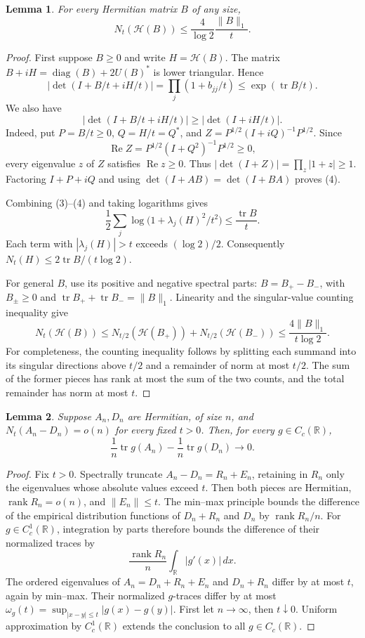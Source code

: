 \documentclass[11pt]{article}
\newtheorem{lemma}{Lemma}
\newcommand{\tr}{\operatorname{tr}}
\newcommand{\Rea}{\operatorname{Re}}
\newcommand{\HH}{\mathcal H}
\begin{document}
\begin{lemma}\label{weak}
For every Hermitian matrix \(B\) of any size,
\[
 N_t(\HH(B))\le \frac{4}{\log 2}\frac{\|B\|_1}{t}.
 \tag{2}
\]
\end{lemma}
\begin{proof}
First suppose \(B\ge0\) and write \(H=\HH(B)\).
The matrix \(B+iH=\operatorname{diag}(B)+2U(B)^*\) is lower triangular.
Hence
\[
 \left|\det(I+B/t+iH/t)\right|
 =\prod_j(1+b_{jj}/t)
 \le \exp(\tr B/t).
 \tag{3}
\]
We also have
\[
 |\det(I+B/t+iH/t)|\ge |\det(I+iH/t)|.
 \tag{4}
\]
Indeed, put \(P=B/t\ge0\), \(Q=H/t=Q^*\), and
\(Z=P^{1/2}(I+iQ)^{-1}P^{1/2}\).
Since
\[
 \Rea Z=P^{1/2}(I+Q^2)^{-1}P^{1/2}\ge0,
\]
every eigenvalue \(z\) of \(Z\) satisfies \(\Rea z\ge0\).
Thus \(|\det(I+Z)|=\prod_z|1+z|\ge1\).
Factoring \(I+P+iQ\) and using
\(\det(I+AB)=\det(I+BA)\) proves (4).

Combining (3)--(4) and taking logarithms gives
\[
 \frac12\sum_j\log\bigl(1+\lambda_j(H)^2/t^2\bigr)
 \le \frac{\tr B}{t}.
\]
Each term with \(|\lambda_j(H)|>t\) exceeds \((\log 2)/2\).
Consequently \(N_t(H)\le 2\tr B/(t\log 2)\).

For general \(B\), use its positive and negative spectral parts:
\(B=B_+-B_-\), with \(B_\pm\ge0\) and
\(\tr B_++\tr B_-=\|B\|_1\). Linearity and the singular-value
counting inequality give
\[
 N_t(\HH(B))
 \le N_{t/2}(\HH(B_+))+N_{t/2}(\HH(B_-))
 \le \frac{4\|B\|_1}{t\log2}.
\]
For completeness, the counting inequality follows by splitting each
summand into its singular directions above \(t/2\) and a remainder
of norm at most \(t/2\). The sum of the former pieces has rank at most
the sum of the two counts, and the total remainder has norm at most \(t\).
\end{proof}

\begin{lemma}\label{stability}
Suppose \(A_n,D_n\) are Hermitian, of size \(n\), and
\(N_t(A_n-D_n)=o(n)\) for every fixed \(t>0\).
Then, for every \(g\in C_c(\mathbb R)\),
\[
 \frac1n\tr g(A_n)-\frac1n\tr g(D_n)\longrightarrow0.
 \tag{5}
\]
\end{lemma}
\begin{proof}
Fix \(t>0\). Spectrally truncate \(A_n-D_n=R_n+E_n\), retaining in
\(R_n\) only the eigenvalues whose absolute values exceed \(t\).
Then both pieces are Hermitian, \(\operatorname{rank}R_n=o(n)\),
and \(\|E_n\|\le t\).
The min--max principle bounds the difference of the empirical
distribution functions of \(D_n+R_n\) and \(D_n\) by
\(\operatorname{rank}R_n/n\).
For \(g\in C_c^1(\mathbb R)\), integration by parts therefore bounds
the difference of their normalized traces by
\[
 \frac{\operatorname{rank}R_n}{n}\int_{\mathbb R}|g'(x)|\,dx.
\]
The ordered eigenvalues of \(A_n=D_n+R_n+E_n\) and \(D_n+R_n\)
differ by at most \(t\), again by min--max. Their normalized
\(g\)-traces differ by at most
\(\omega_g(t)=\sup_{|x-y|\le t}|g(x)-g(y)|\).
First let \(n\to\infty\), then \(t\downarrow0\).
Uniform approximation by \(C_c^1(\mathbb R)\) extends the conclusion
to all \(g\in C_c(\mathbb R)\).
\end{proof}
\end{document}
